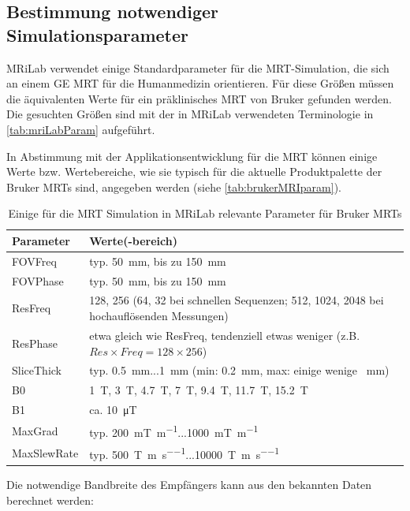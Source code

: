 \subsection{Bestimmung notwendiger Simulationsparameter}
MRiLab verwendet einige Standardparameter für die MRT-Simulation, die sich an einem GE MRT für die Humanmedizin orientieren. Für diese Größen müssen die äquivalenten Werte für ein präklinisches MRT von Bruker gefunden werden. Die gesuchten Größen sind mit der in MRiLab verwendeten Terminologie in \autoref{tab:mriLabParam} aufgeführt.

In Abstimmung mit der Applikationsentwicklung für die MRT können einige Werte bzw. Wertebereiche, wie sie typisch für die aktuelle Produktpalette der Bruker MRTs sind, angegeben werden (siehe \autoref{tab:brukerMRIparam}). 

\begin{table}[H]
	\centering
	\caption[Bruker MRT Simulationsparameter]{Einige für die MRT Simulation in MRiLab relevante Parameter für Bruker MRTs}
	\label{tab:brukerMRIparam}
	\begin{tabularx}{\textwidth}{lX}
		\toprule
		\textbf{Parameter} & \textbf{Werte(-bereich)}\\
		\midrule
		FOVFreq    & typ. \SI{50}{\mm}, bis zu \SI{150}{\mm}\\
		FOVPhase   & typ. \SI{50}{\mm}, bis zu \SI{150}{\mm}\\
		ResFreq    & 128, 256 (64, 32 bei schnellen Sequenzen; 512, 1024, 2048 bei hochauflösenden Messungen)\\
		ResPhase   & etwa gleich wie ResFreq, tendenziell etwas weniger (z.B. $Res \times Freq=128\times256$)\\
		SliceThick & typ. \SI{0.5}{\mm}...\SI{1}{\mm} (min: \SI{0.2}{\mm}, max: einige wenige \SI{}{\mm})\\
		B0         & \SI{1}{\tesla}, \SI{3}{\tesla}, \SI{4.7}{\tesla}, \SI{7}{\tesla}, \SI{9.4}{\tesla}, \SI{11.7}{\tesla}, \SI{15.2}{\tesla} \\
		B1         & ca. \SI{10}{\micro\tesla}\\
		MaxGrad    & typ. \SI{200}{\milli\tesla\per\m}...\SI{1000}{\milli\tesla\per\m}\\
		MaxSlewRate& typ. \SI{500}{\tesla\per\m\per\s}...\SI{10000}{\tesla\per\m\per\s}\\
		\bottomrule
	\end{tabularx}
\end{table}

Die notwendige Bandbreite des Empfängers kann aus den bekannten Daten berechnet werden:

